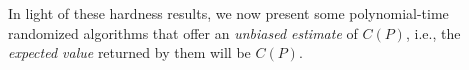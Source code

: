 In light of these hardness results, we now present some polynomial-time randomized algorithms that offer an \emph{unbiased estimate} of $C(P)$, i.e., the \emph{expected value} returned by them will be $C(P)$. 





